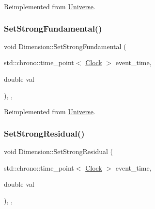 Reimplemented from \mbox{\hyperlink{classUniverse_a5946c8f3d4cda305f3ecd10df21a2f94}{Universe}}.

\mbox{\label{classDimension_a2de864aaa4b1074684395dbe928468c1}} 
\subsubsection{\texorpdfstring{Set\+Strong\+Fundamental()}{SetStrongFundamental()}}
{\footnotesize\ttfamily void Dimension\+::\+Set\+Strong\+Fundamental (\begin{DoxyParamCaption}\item[{std\+::chrono\+::time\+\_\+point$<$ \mbox{\hyperlink{universe_8h_a0ef8d951d1ca5ab3cfaf7ab4c7a6fd80}{Clock}} $>$}]{event\+\_\+time,  }\item[{double}]{val }\end{DoxyParamCaption})\hspace{0.3cm}{\ttfamily [inline]}, {\ttfamily [final]}, {\ttfamily [virtual]}}



Reimplemented from \mbox{\hyperlink{classUniverse_aafec97a231126b71c73ac1258609a284}{Universe}}.

\mbox{\label{classDimension_a9bd5480b1da689cd58bf61dac7169080}} 
\subsubsection{\texorpdfstring{Set\+Strong\+Residual()}{SetStrongResidual()}}
{\footnotesize\ttfamily void Dimension\+::\+Set\+Strong\+Residual (\begin{DoxyParamCaption}\item[{std\+::chrono\+::time\+\_\+point$<$ \mbox{\hyperlink{universe_8h_a0ef8d951d1ca5ab3cfaf7ab4c7a6fd80}{Clock}} $>$}]{event\+\_\+time,  }\item[{double}]{val }\end{DoxyParamCaption})\hspace{0.3cm}{\ttfamily [inline]}, {\ttfamily [final]}, {\ttfamily [virtual]}}



